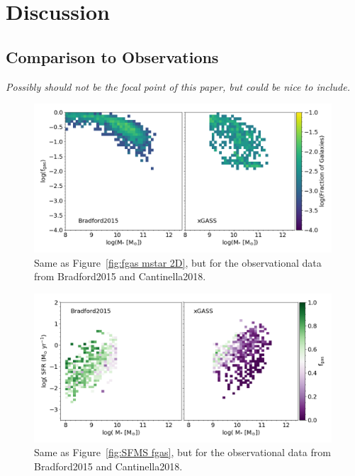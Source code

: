 \documentclass[fleqn,usenatbib]{mnras}
\begin{document}
\section{Discussion}

\subsection{Comparison to Observations}
\label{sec:observations}
{\it Possibly should not be the focal point of this paper, but could be nice to include. } 

\begin{figure}
\includegraphics[width = 0.99\textwidth]{fgas_mstar_2D_log_fgas_obs.png}
\caption{Same as Figure~\ref{fig:fgas mstar 2D}, but for the observational data from Bradford2015 and Cantinella2018.}
\label{fig:fgas mstar 2D obs}
\end{figure}

\begin{figure}
\includegraphics[width = 0.99\textwidth]{SFMS_fits_2dhist_median_obs.png}
\caption{Same as Figure~\ref{fig:SFMS fgas}, but for the observational data from Bradford2015 and Cantinella2018.}
\label{fig:SFMS mstar 2D obs}
\end{figure}
\end{document}

